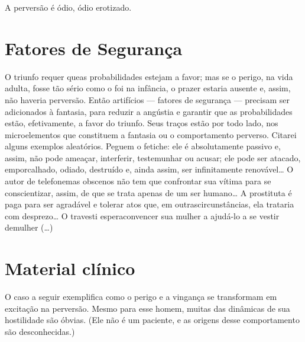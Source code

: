 A perversão é ódio, ódio erotizado.\idxperigofor[|)]


\section{Fatores de Segurança}

O triunfo requer que\idxfantafato[|(] as probabilidades estejam a favor; mas se o
perigo,\idxfeticarti{} na vida adulta, fosse tão sério como o foi na infância, o
prazer estaria ausente e, assim, não haveria perversão. Então
artifícios --- fatores de segurança --- precisam ser adicionados à
fantasia, para reduzir a angústia e garantir que as probabilidades
estão, efetivamente, a favor do triunfo. Seus traços estão por todo
lado, nos microelementos que constituem a fantasia ou o comportamento
perverso. Citarei alguns exemplos aleatórios. Peguem o fetiche: ele é
absolutamente passivo e, assim, não pode ameaçar, interferir,
testemunhar ou acusar; ele pode ser atacado, emporcalhado, odiado,
destruído e, ainda assim, ser infinitamente renovável\ldots{} O autor de
telefonemas\idxtelef{} obscenos não tem que confrontar sua vítima para se
conscientizar, assim, de que se trata apenas de um ser humano\ldots{} A
prostituta é paga para ser agradável e tolerar atos que, em outras\idxperigo[|)]
circunstâncias, ela trataria com desprezo\ldots{} O travesti espera\idxpervexpos[|)]
convencer sua mulher\idxtravempape{} a ajudá-lo a se vestir de\idxfantafato[|)] mulher (\ldots{})

\section{Material clínico}

O caso a seguir exemplifica como o perigo e a vingança se
transformam em excitação na perversão. Mesmo para esse homem, muitas
das dinâmicas de sua hostilidade são óbvias. (Ele não é um paciente, e
as origens desse comportamento são desconhecidas.)


